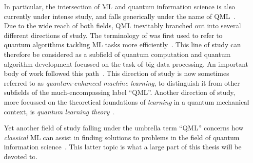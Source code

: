 In particular, the intersection of \ac{ML} and quantum information science is also currently under intense study, and falls generically under the name of \ac{QML}~\cite{wittek2014quantum,schuld2014introduction,adcock2015advances,biamonte2017quantum}.
Due to the wide reach of both fields, \ac{QML} inevitably branched out into several different directions of study.
The terminology of was first used to refer to quantum algorithms tackling \ac{ML} tasks more efficiently~\cite{giovannetti2008quantum,harrow2009quantum,lloyd2013quantum,lloyd2014quantum,rebentrost2014quantum,lloyd2016quantum,rebentrost2018quantum,rebentrost2016quantum}. This line of study can therefore be considered as a subfield of quantum computation and quantum algorithm development focussed on the task of big data processing. An important body of work followed this path~\cite{wittek2014quantum,schuld2014introduction,dunjko2017machine,ciliberto2018quantum,schuld2018supervised,perdomo-ortiz2018opportunities}. This direction of study is now sometimes referred to as \emph{quantum-enhanced machine learning}, to distinguish it from other subfields of the much-encompassing label ``\ac{QML}''.
Another direction of study, more focussed on the theoretical foundations of \emph{learning} in a quantum mechanical context, is \emph{quantum learning theory}~\cite{aaronson2007learnability,aaronson2017shadow,arunachalam2017survey,aaronson2018online,rocchetto2019experimental}.

Yet another field of study falling under the umbrella term ``\ac{QML}'' concerns how \emph{classical} \ac{ML} can assist in finding solutions to problems in the field of quantum information science~\cite{zdeborov2017machine,spears2018deep,carleo2019machine}.
This latter topic is what a large part of this thesis will be devoted to.

